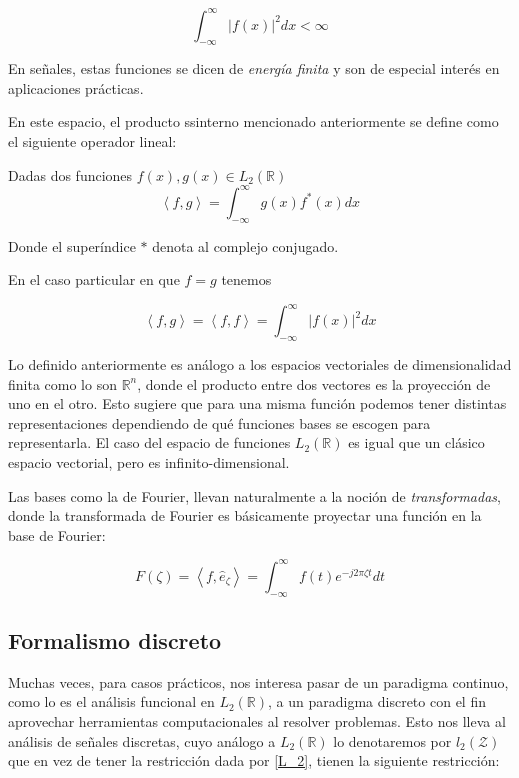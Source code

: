 \documentclass[conference]{IEEEtran}
\begin{document}
\begin{equation}
  \int_{-\infty}^\infty |f(x)|^2 dx < \infty \label{L_2}
\end{equation}

En señales, estas funciones se dicen de \emph{energía finita}    \cite{proakis} y son de especial interés en aplicaciones prácticas.

En este espacio, el producto ssinterno mencionado anteriormente se define como el siguiente operador lineal:

Dadas dos funciones $f(x), g(x) \in L_2(\mathds{R})$
\begin{equation}
  \left< f, g \right> = \int_{-\infty}^\infty g(x) f^* (x) dx
\end{equation}

Donde el superíndice $*$ denota al complejo conjugado.

En el caso particular en que $f = g$ tenemos

\begin{equation}
  \left< f, g \right>=\left< f, f \right>=\int_{-\infty}^\infty |f(x)|^2 dx
\end{equation}


Lo definido anteriormente es análogo a los espacios vectoriales de dimensionalidad finita como lo son $\mathds{R}^n$, donde el producto entre dos vectores es la proyección de uno en el otro. Esto sugiere que para una misma función podemos tener distintas representaciones dependiendo de qué funciones bases se escogen para representarla. El caso del espacio de funciones $L_2(\mathds{R})$ es igual que un clásico espacio vectorial, pero es infinito-dimensional.


Las bases como la de Fourier, llevan naturalmente a la noción de \emph{transformadas}, donde la transformada de Fourier es básicamente proyectar una función en la base de Fourier:

\begin{equation}
  F(\zeta) = \left< f, \hat{e}_\zeta \right> = \int_{-\infty}^\infty f(t) e^{-j2\pi\zeta t} dt
\end{equation}

\subsection{Formalismo discreto}


Muchas veces, para casos prácticos, nos interesa pasar de un paradigma continuo, como lo es el análisis funcional en $L_2(\mathds{R})$, a un paradigma discreto con el fin aprovechar herramientas computacionales al resolver problemas. Esto nos lleva al análisis de señales discretas, cuyo análogo a $L_2(\mathds{R})$ lo denotaremos por $l_2(\mathcal{Z})$ que en vez de tener la restricción dada por \eqref{L_2}, tienen la siguiente restricción:
\end{document}
